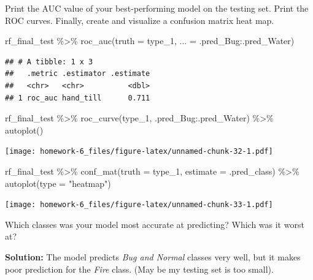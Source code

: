 \documentclass[
]{article}
\newenvironment{Shaded}{\begin{snugshade}}{\end{snugshade}}
\newcommand{\AttributeTok}[1]{\textcolor[rgb]{0.77,0.63,0.00}{#1}}
\newcommand{\FunctionTok}[1]{\textcolor[rgb]{0.00,0.00,0.00}{#1}}
\newcommand{\NormalTok}[1]{#1}
\newcommand{\SpecialCharTok}[1]{\textcolor[rgb]{0.00,0.00,0.00}{#1}}
\newcommand{\StringTok}[1]{\textcolor[rgb]{0.31,0.60,0.02}{#1}}
\begin{document}
Print the AUC value of your best-performing model on the testing set.
Print the ROC curves. Finally, create and visualize a confusion matrix
heat map.

\begin{Shaded}
\begin{Highlighting}[]
\NormalTok{rf\_final\_test }\SpecialCharTok{\%\textgreater{}\%} \FunctionTok{roc\_auc}\NormalTok{(}\AttributeTok{truth =}\NormalTok{ type\_1, }\AttributeTok{... =}\NormalTok{ .pred\_Bug}\SpecialCharTok{:}\NormalTok{.pred\_Water)}
\end{Highlighting}
\end{Shaded}

\begin{verbatim}
## # A tibble: 1 x 3
##   .metric .estimator .estimate
##   <chr>   <chr>          <dbl>
## 1 roc_auc hand_till      0.711
\end{verbatim}

\begin{Shaded}
\begin{Highlighting}[]
\NormalTok{rf\_final\_test }\SpecialCharTok{\%\textgreater{}\%} \FunctionTok{roc\_curve}\NormalTok{(type\_1, .pred\_Bug}\SpecialCharTok{:}\NormalTok{.pred\_Water) }\SpecialCharTok{\%\textgreater{}\%}
  \FunctionTok{autoplot}\NormalTok{()}
\end{Highlighting}
\end{Shaded}

\texttt{[image: homework-6\_files/figure-latex/unnamed-chunk-32-1.pdf]}

\begin{Shaded}
\begin{Highlighting}[]
\NormalTok{rf\_final\_test }\SpecialCharTok{\%\textgreater{}\%}
\FunctionTok{conf\_mat}\NormalTok{(}\AttributeTok{truth =}\NormalTok{ type\_1, }\AttributeTok{estimate =}\NormalTok{ .pred\_class) }\SpecialCharTok{\%\textgreater{}\%}
\FunctionTok{autoplot}\NormalTok{(}\AttributeTok{type =} \StringTok{"heatmap"}\NormalTok{)}
\end{Highlighting}
\end{Shaded}

\texttt{[image: homework-6\_files/figure-latex/unnamed-chunk-33-1.pdf]}

Which classes was your model most accurate at predicting? Which was it
worst at?

\textbf{Solution: } The model predicts \emph{Bug and Normal} classes
very well, but it makes poor prediction for the \emph{Fire} class. (May
be my testing set is too small).
\end{document}
